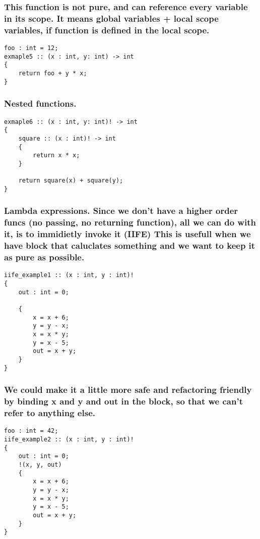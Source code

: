 \documentclass[11pt]{article}
\begin{document}
\subsubsection*{This function is not pure, and can reference every variable in its scope. It means global variables + local scope variables, if function is defined in the local scope.}
\label{sec:org2a173e1}
\begin{verbatim}
foo : int = 12;
exmaple5 :: (x : int, y: int) -> int
{
    return foo + y * x;
}
\end{verbatim}

\subsubsection*{Nested functions.}
\label{sec:org48253dc}
\begin{verbatim}
exmaple6 :: (x : int, y: int)! -> int
{
    square :: (x : int)! -> int
    {
        return x * x;
    }

    return square(x) + square(y);
}
\end{verbatim}

\subsubsection*{Lambda expressions. Since we don't have a higher order funcs (no passing, no returning function), all we can do with it, is to immidietly invoke it (IIFE) This is usefull when we have block that caluclates something and we want to keep it as pure as possible.}
\label{sec:org6e6e2d2}
\begin{verbatim}
iife_example1 :: (x : int, y : int)!
{
    out : int = 0;

    {
        x = x + 6;
        y = y - x;
        x = x * y;
        y = x - 5;
        out = x + y;
    }
}
\end{verbatim}

\subsubsection*{We could make it a little more safe and refactoring friendly by binding x and y and out in the block, so that we can't refer to anything else.}
\label{sec:org52b2bd2}
\begin{verbatim}
foo : int = 42;
iife_example2 :: (x : int, y : int)!
{
    out : int = 0;
    !(x, y, out)
    {
        x = x + 6;
        y = y - x;
        x = x * y;
        y = x - 5;
        out = x + y;
    }
}
\end{verbatim}
\end{document}
